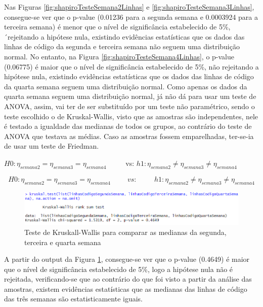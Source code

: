  Nas Figuras \ref{fig:shapiroTesteSemana2Linhas} e \ref{fig:shapiroTesteSemana3Linhas}, consegue-se ver que o p-value (0.01236 para a segunda semana e 0.0003924 para a terceira semana) é menor que o nível de significância estabelecido de 5\%, ´rejeitando a hipótese nula, existindo evidências estatísticas que os dados das linhas de código da segunda e terceira semana não seguem uma distribuição normal. No entanto, na Figura \ref{fig:shapiroTesteSemana4Linhas}, o p-value (0.06775) é maior que o nível de significância estabelecido de 5\%, não rejeitando a hipótese nula, existindo evidências estatísticas que os dados das linhas de código da quarta semana seguem uma distribuição normal.
 Como apenas os dados da quarta semana seguem uma distribuição normal, já não dá para usar um teste de ANOVA, assim, vai ter de ser substituído por um teste não paramétrico, sendo o teste escolhido o de Kruskal-Wallis, visto que as amostras são independentes, nele é testado a igualdade das medianas de todos os grupos, ao contrário do teste de ANOVA que testava as médias. Caso as amostras fossem emparelhadas, ter-se-ia de usar um teste de Friedman.

 \begin{center}
    $H0: {\eta}_{semana2} = {\eta}_{semana3} = {\eta}_{semana4}  \hspace{1cm}$
    \newline
    vs:
    \newline
    $h1: {\eta}_{semana2} \ne {\eta}_{semana3} \ne {\eta}_{semana4}$
    \newline
\end{center}

\[ H0: {\eta}_{semana2} = {\eta}_{semana3} = {\eta}_{semana4}  \hspace{1cm} vs: \hspace{1cm} h1: {\eta}_{semana2} \ne {\eta}_{semana3} \ne {\eta}_{semana4} \] \begin{figure}
    \centering
    \includegraphics[width=0.5\linewidth]{imagens//questao2/testeKruskaWallis.png}
    \caption{ Teste de Kruskall-Wallis para comparar as medianas da segunda, terceira e quarta semana}
    \label{fig:kruskalWallisTestPergunta2}
\end{figure}

A partir do output da Figura \ref{fig:kruskalWallisTestPergunta2}, consegue-se ver que o p-value (0.4649) é maior que o nível de significância estabelecido de 5\%, logo a hipótese nula não é rejeitada, verificando-se que ao contrário do que foi visto a partir da análise das amostras, existem evidências estatísticas que as medianas das linhas de código das três semanas são estatisticamente iguais.

